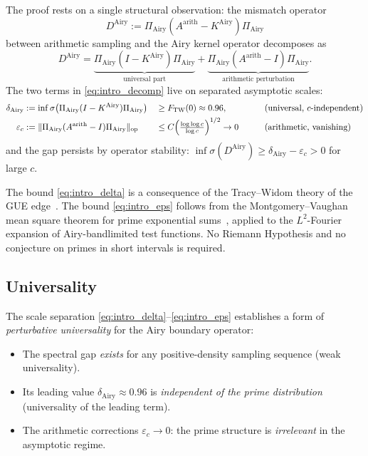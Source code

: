 \documentclass[12pt,a4paper]{amsart}
\newcommand{\DAi}{D^{\mathrm{Airy}}}
\newcommand{\KAi}{K^{\mathrm{Airy}}}
\newcommand{\PAi}{\Pi_{\mathrm{Airy}}}
\newcommand{\Aarith}{A^{\mathrm{arith}}}
\newcommand{\norm}[1]{\|#1\|}
\begin{document}
The proof rests on a single structural observation:
the mismatch operator
\[
  \DAi := \PAi(\Aarith - \KAi)\PAi
\]
between arithmetic sampling and the Airy kernel operator decomposes as
\begin{equation}\label{eq:intro_decomp}
  \DAi = \underbrace{\PAi(I - \KAi)\PAi}_{\text{universal part}}
       + \underbrace{\PAi(\Aarith - I)\PAi}_{\text{arithmetic perturbation}}.
\end{equation}
The two terms in \eqref{eq:intro_decomp} live on separated asymptotic scales:
\begin{alignat}{3}
  \delta_{\mathrm{Airy}}
  &:= \inf\sigma\bigl(\PAi(I-\KAi)\PAi\bigr)
  &&\ge F_{\mathrm{TW}}(0) \approx 0.96,
  \qquad &&\text{(universal, $c$-independent)}
  \label{eq:intro_delta}\\
  \varepsilon_c
  &:= \norm{\PAi(\Aarith - I)\PAi}_{\mathrm{op}}
  &&\le C\Bigl(\tfrac{\log\log c}{\log c}\Bigr)^{1/2} \to 0
  \qquad &&\text{(arithmetic, vanishing)}
  \label{eq:intro_eps}
\end{alignat}
and the gap persists by operator stability:
$\inf\sigma(\DAi) \ge \delta_{\mathrm{Airy}} - \varepsilon_c > 0$ for large $c$.

The bound \eqref{eq:intro_delta} is a consequence of
the Tracy--Widom theory of the GUE edge~\cite{TW1994}.
The bound \eqref{eq:intro_eps} follows from the
Montgomery--Vaughan mean square theorem for prime exponential
sums~\cite{MV1974}, applied to the $L^2$-Fourier expansion of
Airy-bandlimited test functions.
No Riemann Hypothesis and no conjecture on primes in short intervals
is required.

\subsection*{Universality}

The scale separation \eqref{eq:intro_delta}--\eqref{eq:intro_eps}
establishes a form of \emph{perturbative universality} for the
Airy boundary operator:

\begin{itemize}
  \item The spectral gap \emph{exists} for any positive-density
    sampling sequence (weak universality).
  \item Its leading value $\delta_{\mathrm{Airy}} \approx 0.96$
    is \emph{independent of the prime distribution}
    (universality of the leading term).
  \item The arithmetic corrections $\varepsilon_c \to 0$:
    the prime structure is \emph{irrelevant} in the asymptotic regime.
\end{itemize}
\end{document}
